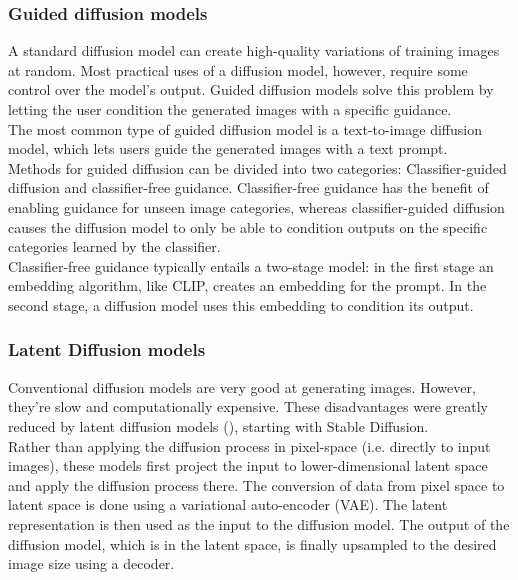 \subsubsection{Guided diffusion models}
A standard diffusion model can create high-quality variations of training images at random. Most practical uses of a diffusion model, however, require some control over the model's output. Guided diffusion models solve this problem by letting the user condition the generated images with a specific guidance.\\
The most common type of guided diffusion model is a text-to-image diffusion model, which lets users guide the generated images with a text prompt.\\
Methods for guided diffusion can be divided into two categories: Classifier-guided diffusion and classifier-free guidance. Classifier-free guidance has the benefit of enabling guidance for unseen image categories, whereas classifier-guided diffusion causes the diffusion model to only be able to condition outputs on the specific categories learned by the classifier.\\
Classifier-free guidance typically entails a two-stage model: in the first stage an embedding algorithm, like CLIP, creates an embedding for the prompt. In the second stage, a diffusion model uses this embedding to condition its output.
\subsubsection{Latent Diffusion models}
Conventional diffusion models are very good at generating images. However, they're slow and computationally expensive. These disadvantages were greatly reduced by latent diffusion models (\cite{rombach_high-resolution_2022}), starting with Stable Diffusion. \\
Rather than applying the diffusion process in pixel-space (i.e. directly to input images), these models first project the input to lower-dimensional latent space and apply the diffusion process there. The conversion of data from pixel space to latent space is done using a variational auto-encoder (VAE). The latent representation is then used as the input to the diffusion model. The output of the diffusion model, which is in the latent space, is finally upsampled to the desired image size using a decoder.
